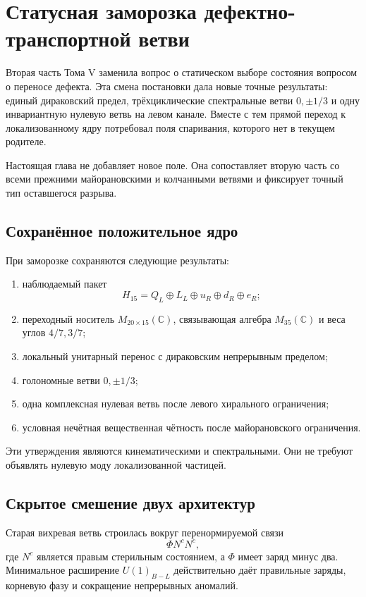 \chapter{Статусная заморозка дефектно-транспортной ветви}

Вторая часть Тома V заменила вопрос о статическом выборе состояния
вопросом о переносе дефекта. Эта смена постановки дала новые точные
результаты: единый дираковский предел, трёхциклические спектральные ветви
$0,\pm1/3$ и одну инвариантную нулевую ветвь на левом канале. Вместе с тем
прямой переход к локализованному ядру потребовал поля спаривания, которого
нет в текущем родителе.

Настоящая глава не добавляет новое поле. Она сопоставляет вторую часть со
всеми прежними майорановскими и колчанными ветвями и фиксирует точный тип
оставшегося разрыва.

\section{Сохранённое положительное ядро}

При заморозке сохраняются следующие результаты:
\begin{enumerate}
 \item наблюдаемый пакет
 \begin{equation}
 H_{15}=Q_L\oplus L_L\oplus u_R\oplus d_R\oplus e_R;
 \end{equation}
 \item переходный носитель $M_{20\times15}(\mathbb C)$, связывающая
 алгебра $M_{35}(\mathbb C)$ и веса углов $4/7,3/7$;
 \item локальный унитарный перенос с дираковским непрерывным пределом;
 \item голономные ветви $0,\pm1/3$;
 \item одна комплексная нулевая ветвь после левого хирального ограничения;
 \item условная нечётная вещественная чётность после майорановского
 ограничения.
\end{enumerate}
Эти утверждения являются кинематическими и спектральными. Они не требуют
объявлять нулевую моду локализованной частицей.

\section{Скрытое смешение двух архитектур}

Старая вихревая ветвь строилась вокруг перенормируемой связи
\begin{equation}
 \Phi N^cN^c,
 \label{eq:v5-freeze-old-majorana-vertex}
\end{equation}
где $N^c$ является правым стерильным состоянием, а $\Phi$ имеет заряд
минус два. Минимальное расширение $U(1)_{B-L}$ действительно даёт
правильные заряды, корневую фазу и сокращение непрерывных аномалий.

